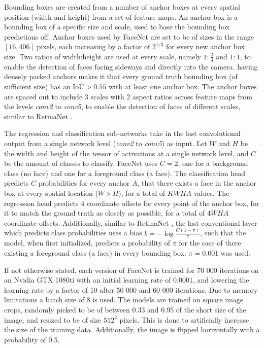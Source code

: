 \documentclass[a4paper, twoside]{article}
\begin{document}
Bounding boxes are created from a number of anchor boxes at every spatial position (width and height) from a set of feature maps. An anchor box is a bounding box of a specific size and scale, used to base the bounding box predictions off. Anchor boxes used by FaceNet are set to be of sizes in the range $[16, 406]$ pixels, each increasing by a factor of $2^{1/3}$ for every new anchor box size. Two ratios of width:height are used at every scale, namely $1:\frac{2}{3}$ and $1:1$, to enable the detection of faces facing sideways and directly into the camera. having densely packed anchors makes it that every ground truth bounding box (of sufficient size) has an IoU$>0.55$ with at least one anchor box. The anchor boxes are spaced out to include 3 scales with 2 aspect ratios across feature maps from the levels \textit{conv2} to \textit{conv5}, to enable the detection of faces of different scales, similar to RetinaNet \cite{retinanet}.

The regression and classification sub-networks take in the last convolutional output from a single network level (\textit{conv2} to \textit{conv5}) as input. Let $W$ and $H$ be the width and height of the tensor of activations at a single network level, and $C$ be the amount of classes to classify. FaceNet uses $C=2$, one for a background class (no face) and one for a foreground class (a face). The classification head predicts $C$ probabilities for every anchor $A$, that there exists a face in the anchor box at every spatial location ($W \times H$), for a total of $KWHA$ values. The regression head predicts $4$ coordinate offsets for every point of the anchor box, for it to match the ground truth as closely as possible, for a total of $4WHA$ coordinate offsets. Additionally, similar to RetinaNet \cite{retinanet}, the last conventional layer which predicts class probabilities uses a bias $b = -\log{\frac{C(1-\pi)}{\pi}}$, such that the model, when first initialized, predicts a probability of $\pi$ for the case of there existing a foreground class (a face) in every bounding box. $\pi = 0.001$ was used.

If not otherwise stated, each version of FaceNet is trained for 70 000 iterations on an Nvidia GTX 1080ti with an initial learning rate of 0.0001, and lowering the learning rate by a factor of 10 after 50 000 and 60 000 iterations. Due to memory limitations a batch size of 8 is used. The models are trained on square image crops, randomly picked to be of between 0.33 and 0.95 of the short size of the image, and resized to be of size $512^2$ pixels. This is done to artificially increase the size of the training data. Additionally, the image is flipped horizontally with a probability of 0.5.
\end{document}
